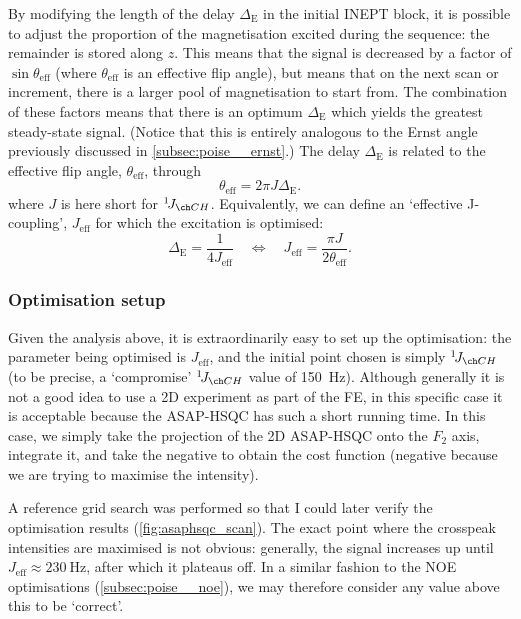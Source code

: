 By modifying the length of the delay $\Delta_\text{E}$ in the initial INEPT block, it is possible to adjust the proportion of the  magnetisation excited during the sequence: the remainder is stored along $z$.
This means that the signal is decreased by a factor of $\sin\theta_\text{eff}$ (where $\theta_\text{eff}$ is an effective flip angle), but means that on the next scan or increment, there is a larger pool of  magnetisation to start from.
The combination of these factors means that there is an optimum $\Delta_\text{E}$ which yields the greatest steady-state signal.
(Notice that this is entirely analogous to the Ernst angle previously discussed in \cref{subsec:poise__ernst}.)
The delay $\Delta_\text{E}$ is related to the effective flip angle, $\theta_\text{eff}$, through
\begin{equation}
    \label{eq:asaphsqc_ernst_angle}
    \theta_\text{eff} = 2\pi J \Delta_\text{E}.
\end{equation}
where $J$ is here short for $\oneJ{CH}$.
Equivalently, we can define an `effective J-coupling', $J_\text{eff}$ for which the excitation is optimised:
\begin{equation}
    \label{eq:asaphsqc_j_eff}
    \Delta_\text{E} = \frac{1}{4 J_\text{eff}} \quad\Longleftrightarrow\quad J_\text{eff} = \frac{\pi J}{2\theta_\text{eff}}.
\end{equation}


\subsubsection{Optimisation setup}

Given the analysis above, it is extraordinarily easy to set up the optimisation: the parameter being optimised is $J_\text{eff}$, and the initial point chosen is simply $\oneJ{CH}$ (to be precise, a `compromise' $\oneJ{CH}$ value of \SI{150}{\Hz}).
Although generally it is not a good idea to use a 2D experiment as part of the FE, in this specific case it is acceptable because the ASAP-HSQC has such a short running time.
In this case, we simply take the projection of the 2D ASAP-HSQC onto the $F_2$ axis, integrate it, and take the negative to obtain the cost function (negative because we are trying to maximise the intensity).

A reference grid search was performed so that I could later verify the optimisation results (\cref{fig:asaphsqc_scan}).
The exact point where the crosspeak intensities are maximised is not obvious: generally, the signal increases up until $J_\text{eff} \approx \SI{230}{\Hz}$, after which it plateaus off.
In a similar fashion to the NOE optimisations (\cref{subsec:poise__noe}), we may therefore consider any value above this to be `correct'.

